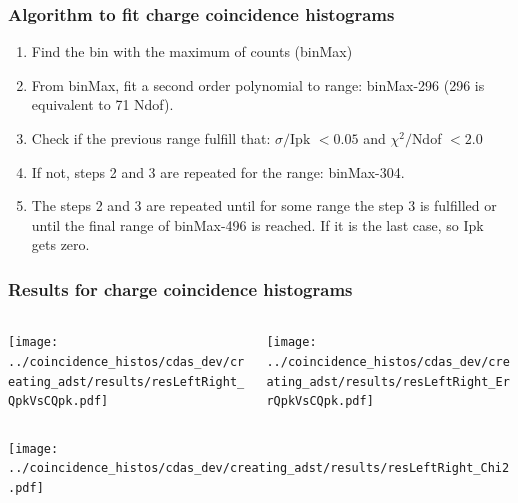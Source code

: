 \documentclass[aspectratio=169]{beamer}
\begin{document}
\begin{frame}
  \frametitle{Algorithm to fit charge coincidence histograms}
  \begin{enumerate}
    \item Find the bin with the maximum of counts (binMax)           
    \item From binMax, fit a second order polynomial to range:
      binMax-296 (296 is equivalent to 71 Ndof).
    \item Check if the previous range fulfill that: $\sigma/$Ipk
      $<0.05$ and $\chi^2/$Ndof $<2.0$
    \item If not, steps 2 and 3 are repeated for the range:
      binMax-304.
    \item The steps 2 and 3 are repeated until for some range the
      step 3 is fulfilled or until the final range of binMax-496
      is reached. If it is the last case, so Ipk gets zero.
  \end{enumerate}
\end{frame}


\begin{frame}
  \frametitle{Results for charge coincidence histograms}
  \vspace{0.5cm}

  \begin{columns}
    \centering
    \begin{column}{0.5\textwidth}
      \texttt{[image: ../coincidence\_histos/cdas\_dev/creating\_adst/results/resLeftRight\_QpkVsCQpk.pdf]}
    \end{column}
    \begin{column}{0.5\textwidth}
      \texttt{[image: ../coincidence\_histos/cdas\_dev/creating\_adst/results/resLeftRight\_ErrQpkVsCQpk.pdf]}
    \end{column}
  \end{columns}

  \begin{columns}
    \centering
    \begin{column}{0.5\textwidth}
      \texttt{[image: ../coincidence\_histos/cdas\_dev/creating\_adst/results/resLeftRight\_Chi2.pdf]}
    \end{column}
  \end{columns}

\end{frame}
\end{document}
